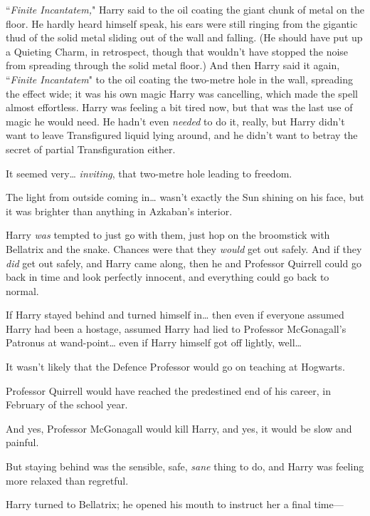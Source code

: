 \later

``\emph{Finite Incantatem,}" Harry said to the oil coating the giant chunk of metal on the floor. He hardly heard himself speak, his ears were still ringing from the gigantic thud of the solid metal sliding out of the wall and falling. (He should have put up a Quieting Charm, in retrospect, though that wouldn't have stopped the noise from spreading through the solid metal floor.) And then Harry said it again, ``\emph{Finite Incantatem}" to the oil coating the two-metre hole in the wall, spreading the effect wide; it was his own magic Harry was cancelling, which made the spell almost effortless. Harry was feeling a bit tired now, but that was the last use of magic he would need. He hadn't even \emph{needed} to do it, really, but Harry didn't want to leave Transfigured liquid lying around, and he didn't want to betray the secret of partial Transfiguration either.

It seemed very{\ldots} \emph{inviting}, that two-metre hole leading to freedom.

The light from outside coming in{\ldots} wasn't exactly the Sun shining on his face, but it was brighter than anything in Azkaban's interior.

Harry \emph{was} tempted to just go with them, just hop on the broomstick with Bellatrix and the snake. Chances were that they \emph{would} get out safely. And if they \emph{did} get out safely, and Harry came along, then he and Professor Quirrell could go back in time and look perfectly innocent, and everything could go back to normal.

If Harry stayed behind and turned himself in{\ldots} then even if everyone assumed Harry had been a hostage, assumed Harry had lied to Professor McGonagall's Patronus at wand-point{\ldots} even if Harry himself got off lightly, well{\ldots}

It wasn't likely that the Defence Professor would go on teaching at Hogwarts.

Professor Quirrell would have reached the predestined end of his career, in February of the school year.

And yes, Professor McGonagall would kill Harry, and yes, it would be slow and painful.

But staying behind was the sensible, safe, \emph{sane} thing to do, and Harry was feeling more relaxed than regretful.

Harry turned to Bellatrix; he opened his mouth to instruct her a final time—

